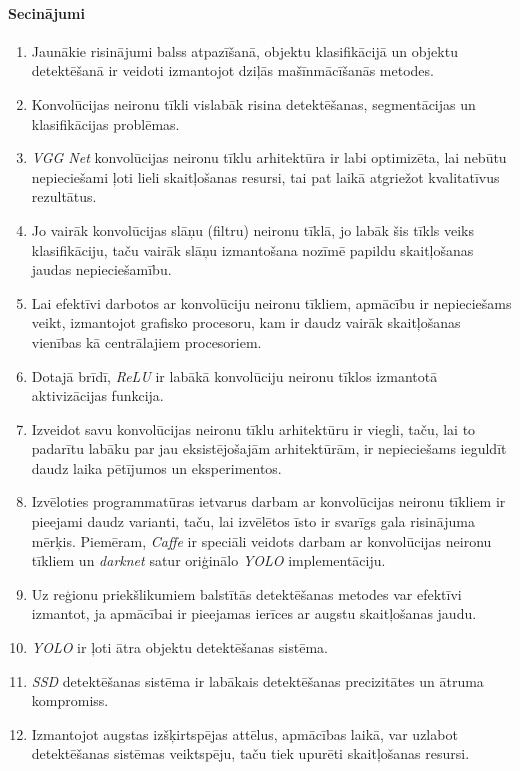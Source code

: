 \paragraph{Secinājumi}
\hfill\par
\begin{enumerate}
	\item Jaunākie risinājumi balss atpazīšanā, objektu klasifikācijā un objektu detektēšanā ir veidoti izmantojot dziļās mašīnmācīšanās metodes.
	\item Konvolūcijas neironu tīkli vislabāk risina detektēšanas, segmentācijas un klasifikācijas problēmas.
	\item \textit{VGG Net} konvolūcijas neironu tīklu arhitektūra ir labi optimizēta, lai nebūtu nepieciešami ļoti lieli skaitļošanas resursi, tai pat laikā atgriežot kvalitatīvus rezultātus.
	\item Jo vairāk konvolūcijas slāņu (filtru) neironu tīklā, jo labāk šis tīkls veiks klasifikāciju, taču vairāk slāņu izmantošana nozīmē papildu skaitļošanas jaudas nepieciešamību.
	\item Lai efektīvi darbotos ar konvolūciju neironu tīkliem, apmācību ir nepieciešams veikt, izmantojot grafisko procesoru, kam ir daudz vairāk skaitļošanas vienības kā centrālajiem procesoriem.
	\item Dotajā brīdī, \textit{ReLU} ir labākā konvolūciju neironu tīklos izmantotā aktivizācijas funkcija. 
	\item Izveidot savu konvolūcijas neironu tīklu arhitektūru ir viegli, taču, lai to padarītu labāku par jau eksistējošajām arhitektūrām, ir nepieciešams ieguldīt daudz laika pētījumos un eksperimentos.
	\item Izvēloties programmatūras ietvarus darbam ar konvolūcijas neironu tīkliem ir pieejami daudz varianti, taču, lai izvēlētos īsto ir svarīgs gala risinājuma mērķis. Piemēram, \textit{Caffe} ir speciāli veidots darbam ar konvolūcijas neironu tīkliem un \textit{darknet} satur oriģinālo \textit{YOLO} implementāciju. 
	\item Uz reģionu priekšlikumiem balstītās detektēšanas metodes var efektīvi izmantot, ja apmācībai ir pieejamas ierīces ar augstu skaitļošanas jaudu.
	\item \textit{YOLO} ir ļoti ātra objektu detektēšanas sistēma.
	\item \textit{SSD} detektēšanas sistēma ir labākais detektēšanas precizitātes un ātruma kompromiss.
	\item Izmantojot augstas izšķirtspējas attēlus, apmācības laikā, var uzlabot detektēšanas sistēmas veiktspēju, taču tiek upurēti skaitļošanas resursi.

\end{enumerate}
